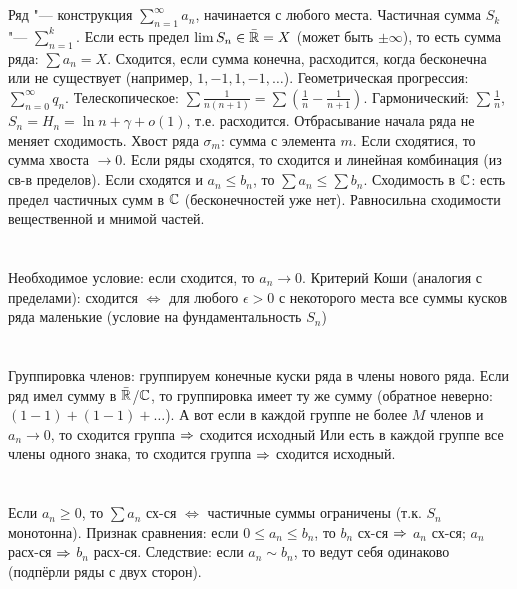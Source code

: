 \section{} %
Ряд "--- конструкция $\sum_{n=1}^\infty a_n$, начинается с любого места.
Частичная сумма $S_k$ "--- $\sum_{n=1}^k$.
Если есть предел $\lim S_n \in \bar {\mathbb{R}} = X$ (может быть $\pm\infty$), то есть сумма ряда: $\sum a_n = X$.
Сходится, если сумма конечна, расходится, когда бесконечна или не существует (например, $1, -1, 1, -1, \dots$).
Геометрическая прогрессия: $\sum_{n=0}^\infty q_n$.
Телескопическое: $\sum \frac{1}{n(n+1)} = \sum \left(\frac 1 n - \frac 1 {n+1}\right)$.
Гармонический: $\sum \frac 1 n$, $S_n = H_n = \ln n + \gamma + o(1)$, т.е. расходится.
Отбрасывание начала ряда не меняет сходимость.
Хвост ряда $\sigma_m$: сумма с элемента $m$.
Если сходятися, то сумма хвоста $\to 0$.
Если ряды сходятся, то сходится и линейная комбинация (из св-в пределов).
Если сходятся и $a_n \le b_n$, то $\sum a_n \le \sum b_n$.
Сходимость в $\mathbb{C}$: есть предел частичных сумм в $\mathbb{C}$ (бесконечностей уже нет).
Равносильна сходимости вещественной и мнимой частей.

\section{} %
Необходимое условие: если сходится, то $a_n \to 0$.
Критерий Коши (аналогия с пределами): сходится $\iff$ для любого $\epsilon > 0$ с некоторого места все суммы кусков ряда маленькие
(условие на фундаментальность $S_n$)

\section{} %
Группировка членов: группируем конечные куски ряда в члены нового ряда.
Если ряд имел сумму в $\bar {\mathbb{R}}$/$\mathbb{C}$, то группировка имеет ту же сумму (обратное неверно: $(1-1)+(1-1)+\dots$).
А вот если в каждой группе не более $M$ членов и $a_n \to 0$, то сходится группа $\Rightarrow$ сходится исходный
Или есть в каждой группе все члены одного знака, то сходится группа $\Rightarrow$ сходится исходный.

\section{} %
Если $a_n \ge 0$, то $\sum a_n$ сх-ся $\iff$ частичные суммы ограничены (т.к. $S_n$ монотонна).
Признак сравнения: если $0 \le a_n \le b_n$, то $b_n$ сх-ся $\Rightarrow$ $a_n$ сх-ся; $a_n$ расх-ся $\Rightarrow$ $b_n$ расх-ся.
Следствие: если $a_n \sim b_n$, то ведут себя одинаково (подпёрли ряды с двух сторон).

